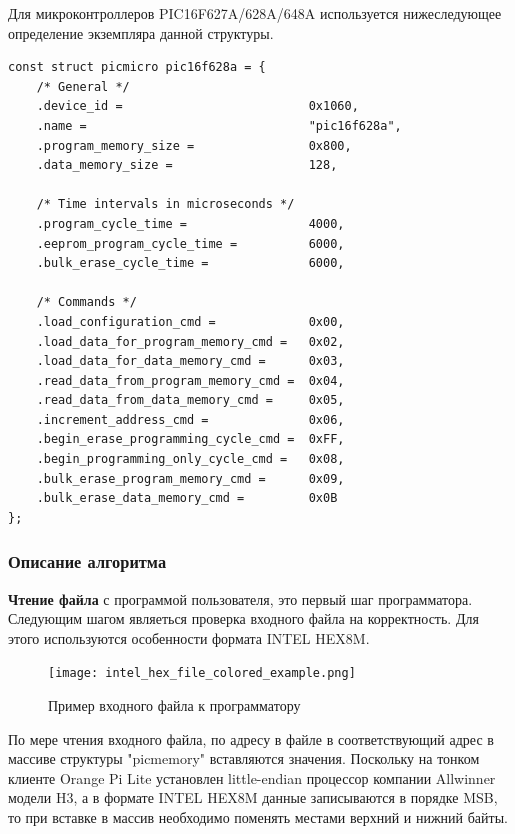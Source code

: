 Для микроконтроллеров PIC16F627A/628A/648A используется нижеследующее определение экземпляра данной структуры.
\begin{small}
\begin{verbatim}
const struct picmicro pic16f628a = {
    /* General */
    .device_id =                          0x1060,
    .name =                               "pic16f628a",
    .program_memory_size =                0x800,
    .data_memory_size =                   128,
    
    /* Time intervals in microseconds */
    .program_cycle_time =                 4000,
    .eeprom_program_cycle_time =          6000,
    .bulk_erase_cycle_time =              6000,
    
    /* Commands */
    .load_configuration_cmd =             0x00,
    .load_data_for_program_memory_cmd =   0x02,
    .load_data_for_data_memory_cmd =      0x03,
    .read_data_from_program_memory_cmd =  0x04,
    .read_data_from_data_memory_cmd =     0x05,
    .increment_address_cmd =              0x06,
    .begin_erase_programming_cycle_cmd =  0xFF,
    .begin_programming_only_cycle_cmd =   0x08,
    .bulk_erase_program_memory_cmd =      0x09,
    .bulk_erase_data_memory_cmd =         0x0B
};
\end{verbatim}
\end{small}


\subsubsection{Описание алгоритма}

\textbf{Чтение файла} с программой пользователя, это первый шаг программатора. Следующим шагом 
являеться проверка входного файла на корректность. Для этого используются особенности формата INTEL HEX8M.


\begin{figure}[h!]
    \centering
    \texttt{[image: intel\_hex\_file\_colored\_example.png]}
    \caption{Пример входного файла к программатору}
\end{figure}


По мере чтения входного файла, по адресу в файле в соответствующий адрес в массиве структуры "picmemory" вставляются значения. 
Поскольку на тонком клиенте Orange Pi Lite установлен little-endian процессор 
компании Allwinner модели H3, а в формате INTEL HEX8M данные записываются в порядке 
MSB, то при вставке в массив необходимо поменять местами верхний и нижний байты.


